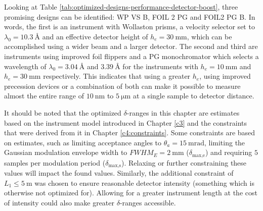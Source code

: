 Looking at Table \ref{tab:optimized-designs-performance-detector-boost}, three promising designs can be identified: WP VS B, FOIL 2 PG and FOIL2 PG B. In words, the first is an instrument with Wollaston prisms, a velocity selector set to $\lambda_0 = \SI{10.3}{\angstrom}$ and an effective detector height of $h_e = \SI{30}{\milli\meter}$, which can be accomplished using a wider beam and a larger detector. The second and third are instruments using improved foil flippers and a PG monochromator which selects a wavelength of $\lambda_0 = \SI{3.04}{\angstrom}$ and $\SI{3.39}{\angstrom}$ for the instruments with $h_e = \SI{10}{\milli\meter}$ and $h_e = \SI{30}{\milli\meter}$ respectively. This indicates that using a greater $h_e$, using improved precession devices or a combination of both can make it possible to measure almost the entire range of $\SI{10}{\nano\meter}$ to $ \SI{5}{\micro\meter}$ at a single sample to detector distance. 

It should be noted that the optimized $\delta$-ranges in this chapter are estimates based on the instrument model introduced in Chapter \ref{c3} and the constraints that were derived from it in Chapter \ref{c4:constraints}. Some constraints are based on estimates, such as limiting acceptance angles to $\theta_a = \SI{15}{\milli\radian}$, limiting the Gaussian modulation envelope width to $FWHM_E = \SI{2}{\milli\meter}$ ($\delta_{\text{max,e}}$) and requiring $5$ samples per modulation period ($\delta_{\text{max,s}}$). Relaxing or further constraining these values will impact the found values. Similarly, the additional constraint of $L_1 \leq \SI{5}{\meter}$ was chosen to ensure reasonable detector intensity (something which is otherwise not optimized for). Allowing for a greater instrument length at the cost of intensity could also make greater $\delta$-ranges accessible.

